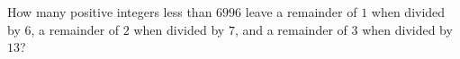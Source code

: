 How many positive integers less than $6996$ leave a remainder of $1$ when divided by $6$, a remainder of $2$ when divided by $7$, and a remainder of $3$ when divided by $13$?
